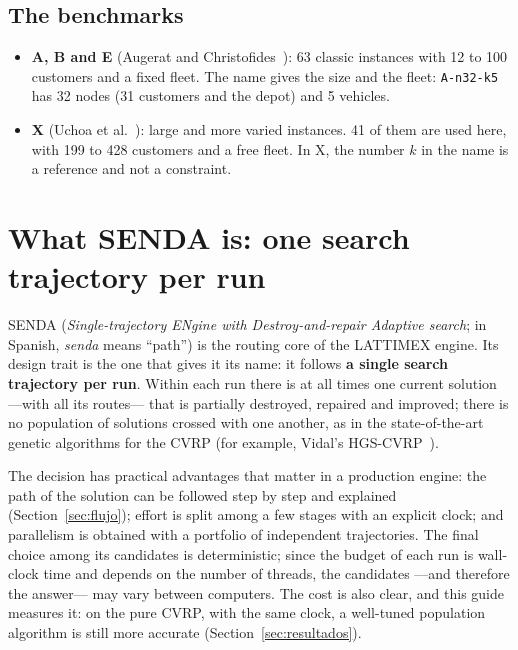 \documentclass[11pt,a4paper]{article}
\newcommand{\tsl}[1]{\texttt{\small #1}}
\begin{document}
\subsection{The benchmarks}
\begin{itemize}[leftmargin=1.5em]
\item \textbf{A, B and E} (Augerat and Christofides~\cite{augerat1995,christofides1969}): 63 classic
instances with 12 to 100 customers and a fixed fleet. The name gives the size and the fleet:
\tsl{A-n32-k5} has 32 nodes (31 customers and the depot) and 5 vehicles.
\item \textbf{X} (Uchoa et al.~\cite{uchoa2017}): large and more varied instances. 41 of them are used
here, with 199 to 428 customers and a free fleet. In X, the number $k$ in the name is a reference and
not a constraint.
\end{itemize}

\section{What SENDA is: one search trajectory per run}
\label{sec:senda}

SENDA (\emph{Single-trajectory ENgine with Destroy-and-repair Adaptive search}; in Spanish,
\emph{senda} means ``path'') is the routing core of the LATTIMEX engine. Its design trait is the one
that gives it its name: it follows \textbf{a single search trajectory per run}. Within each run there
is at all times one current solution ---with all its routes--- that is partially destroyed, repaired
and improved; there is no population of solutions crossed with one another, as in the
state-of-the-art genetic algorithms for the CVRP (for example, Vidal's
HGS-CVRP~\cite{vidal2022hgs}).

The decision has practical advantages that matter in a production engine: the path of the solution
can be followed step by step and explained (Section~\ref{sec:flujo}); effort is split among a few
stages with an explicit clock; and parallelism is obtained with a portfolio of independent
trajectories. The final choice among its candidates is deterministic; since the budget of each run is
wall-clock time and depends on the number of threads, the candidates ---and therefore the answer---
may vary between computers. The cost is also clear, and this guide measures it: on the pure CVRP,
with the same clock, a well-tuned population algorithm is still more accurate
(Section~\ref{sec:resultados}).
\end{document}
